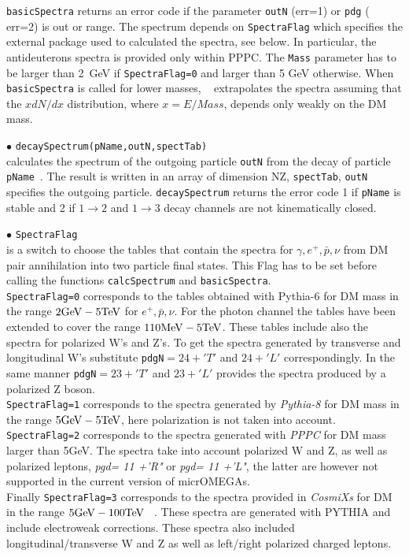 \documentclass[12pt,a4paper]{article}
\begin{document}
{\tt basicSpectra} returns an error code if the  parameter {\tt outN} (err=1) or {\tt pdg} ( err=2) is out or range.   
The spectrum  depends on  {\tt SpectraFlag} which specifies the external package used to calculated the  spectra, see below.
In particular, the antideuterons spectra is provided  only within  PPPC.
The {\tt Mass} parameter has to be larger than 2~GeV if {\tt SpectraFlag=0} and larger than 5 GeV otherwise. 
When \verb|basicSpectra| is  called for lower masses, \micro~  extrapolates the spectra  assuming that the  $xdN/dx$ distribution, where $x= E/Mass$, depends only weakly on the  DM mass.    

\noindent
$\bullet$ \verb|decaySpectrum(pName,outN,spectTab)|\\
calculates the spectrum of the outgoing particle  {\tt  outN} from the decay of particle {\tt pName }.  The result is written in an array of dimension NZ, \verb|spectTab|, {\tt  outN}  specifies the outgoing particle.  {\tt decaySpectrum} returns  the  error code 1  if  {\tt pName} is stable and 2 if  $1\to 2$ and  $1\to 3$ decay channels are not kinematically closed.



\noindent
$\bullet$   \verb|SpectraFlag| \\
is a switch to choose the tables that contain the spectra  for $\gamma,e^+,\bar{p},\nu$ from DM pair annihilation into two particle final states. This Flag has to be set before calling the functions {\tt calcSpectrum} and {\tt basicSpectra}. 
 \\
{\tt SpectraFlag=0} corresponds to the tables obtained with  Pythia-6 \cite{Belanger:2010gh}  for  DM mass in the range  $2{\rm  GeV} - 5{\rm TeV}$ for $e^+,\bar{p},\nu$. 
For the photon channel the tables  have  been extended to cover the range $110 {\rm MeV} - 5{\rm TeV}$.
These tables include also the spectra for polarized W's and Z's.
To get the spectra generated by transverse and longitudinal W's substitute 
\verb|pdgN|$=24+'T'$ and $24+'L'$ correspondingly. In the same manner \verb|pdgN|$=23+'T'$ and
$23+'L'$  provides the spectra produced by a polarized Z boson.\\
{\tt SpectraFlag=1} corresponds to the spectra generated by {\it Pythia-8} \cite{Amoroso:2018qga, Jueid:2022qjg} for DM mass in the range  $5{\rm  GeV} - 5{\rm TeV}$, here polarization is not taken into account.\\
{\tt SpectraFlag=2} corresponds to the 
 spectra generated with {\it PPPC}  \cite{Ciafaloni_2011,Marco_Cirelli_2011} for DM mass larger than 5GeV. The spectra take into account polarized W and Z,  as well as
polarized leptons, {\it  pgd= 11 +'R"} or {\it  pgd= 11 +'L"},  the latter are however not supported
in the current version of micrOMEGAs.\\
Finally {\tt SpectraFlag=3} corresponds to the  spectra  provided in  {\it CosmiXs} for DM in the range  $5{\rm  GeV} - 100{\rm TeV}$ ~\cite{Arina:2023eic}. These spectra are generated with PYTHIA and include electroweak corrections. These  spectra also included longitudinal/transverse  W and Z  as well as  left/right polarized  charged leptons.
\end{document}

